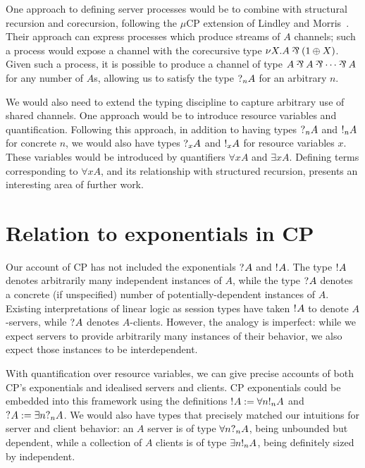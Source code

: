 One approach to defining server processes would be to combine \nodcap with
structural recursion and corecursion, following the $\mu\text{CP}$ extension of Lindley
and Morris~\cite{lindley2016}.  Their approach can express processes which
produce streams of $A$ channels; such a process would expose a channel with the
corecursive type $\nu X. A \parr (1 \plus X)$.  Given such a process, it is
possible to produce a channel of type $A \parr A \parr \cdots \parr A$ for any
number of $A$s, allowing us to satisfy the type $\give[n]{A}$ for an arbitrary
$n$.

We would also need to extend the typing discipline to capture arbitrary use of
shared channels.  One approach would be to introduce resource variables and
quantification.  Following this approach, in addition to having types $\give[n]
A$ and $\take[n] A$ for concrete $n$, we would also have types $\give[x] A$ and
$\take[x] A$ for resource variables $x$.  These variables would be introduced by
quantifiers $\forall x A$ and $\exists x A$.  Defining terms
corresponding to $\forall x A$, and its relationship with structured recursion,
presents an interesting area of further work.

\section{Relation to exponentials in CP}
Our account of CP has not included the exponentials $\give A$ and $\take A$.
The type $\take A$ denotes arbitrarily many independent instances of $A$, while
the type $\give A$ denotes a concrete (if unspecified) number of
potentially-dependent instances of $A$.  Existing interpretations of linear
logic as session types have taken $\take A$ to denote $A$-servers, while
$\give A$ denotes $A$-clients.  However, the analogy is imperfect: while we
expect servers to provide arbitrarily many instances of their behavior, we also
expect those instances to be interdependent.

With quantification over resource variables, we can give precise accounts
of both CP's exponentials and idealised servers and clients.  CP
exponentials could be embedded into this framework using the definitions
$\take{A} := \forall{n}\take[n]{A}$ and $\give{A} := \exists{n}{\give[n]{A}}$.
We would also have types that precisely matched our intuitions for server and
client behavior: an $A$ server is of type $\forall n \give[n] A$, being
unbounded but dependent, while a collection of $A$ clients is of type
$\exists n \take[n] A$, being definitely sized by independent.

